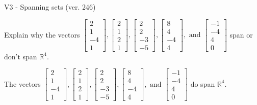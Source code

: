 \begin{exercise}
  \begin{exerciseTitle}V3 - Spanning sets (ver. 246)\end{exerciseTitle}
  \begin{exerciseStatement}
    Explain why the vectors \(\left[\begin{array}{r}
2 \\
1 \\
-4 \\
1
\end{array}\right] , \left[\begin{array}{r}
2 \\
1 \\
2 \\
1
\end{array}\right] , \left[\begin{array}{r}
2 \\
2 \\
-3 \\
-5
\end{array}\right] , \left[\begin{array}{r}
8 \\
4 \\
-4 \\
4
\end{array}\right] , \text{ and } \left[\begin{array}{r}
-1 \\
-4 \\
4 \\
0
\end{array}\right]\) span or don't span \(\mathbb{R}^4\). 
	


  \end{exerciseStatement}
  \begin{exerciseAnswer}
   The vectors \(\left[\begin{array}{r}
2 \\
1 \\
-4 \\
1
\end{array}\right] , \left[\begin{array}{r}
2 \\
1 \\
2 \\
1
\end{array}\right] , \left[\begin{array}{r}
2 \\
2 \\
-3 \\
-5
\end{array}\right] , \left[\begin{array}{r}
8 \\
4 \\
-4 \\
4
\end{array}\right] , \text{ and } \left[\begin{array}{r}
-1 \\
-4 \\
4 \\
0
\end{array}\right]\) 
  	 do  
	span \(\mathbb{R}^4\).
  


  \end{exerciseAnswer}
\end{exercise}